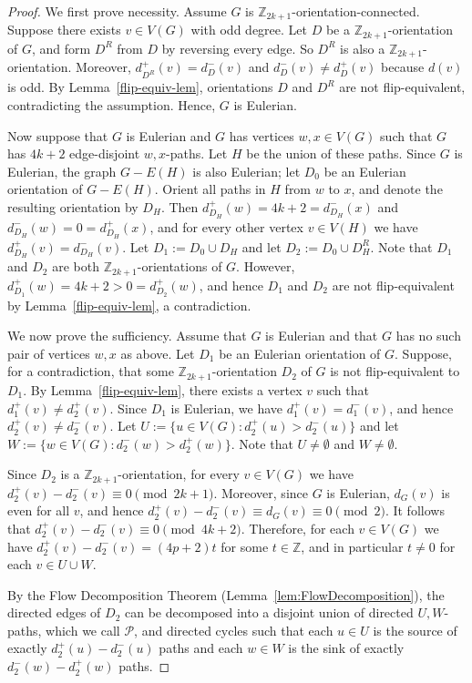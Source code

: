\documentclass[a4paper,12pt]{article}
\theoremstyle{plain}
\theoremstyle{definition}
\newcommand{\Z}{\mathbb{Z}}
\begin{document}
\begin{proof}
We first prove necessity. Assume $G$ is $\Z_{2k+1}$-orientation-connected.
Suppose there exists $v \in V(G)$ with odd degree. Let $D$ be a $\Z_{2k+1}$-orientation of $G$, and form $D^R$ from $D$ by reversing every edge. So $D^R$ is also a $\Z_{2k+1}$-orientation. 
Moreover, $d_{D^R}^+(v)=d_D^-(v)$ and $d_D^-(v)\neq d_D^+(v)$ because $d(v)$ is odd. By Lemma~\ref{flip-equiv-lem}, orientations $D$ and $D^R$ are not flip-equivalent, contradicting the assumption. Hence, $G$ is Eulerian.

Now suppose that $G$ is Eulerian and $G$ has vertices $w,x \in V(G)$ such that $G$ has $4k+2$ edge-disjoint $w,x$-paths. Let $H$ be the union of these paths. Since $G$ is Eulerian, the graph $G - E(H)$ is also Eulerian; let $D_0$ be an Eulerian orientation of $G - E(H)$. Orient all paths in $H$ from $w$ to $x$, and denote the resulting orientation by $D_H$. 
Then 
$d_{D_H}^+(w)=4k+2=d_{D_H}^-(x)$ and
$d_{D_H}^-(w)=0=d_{D_H}^+(x)$, and for every other vertex $v \in V(H)$ we have $d_{D_H}^+(v)=d_{D_H}^-(v)$. Let $D_1 := D_0 \cup D_H$ and let $D_2 := D_0 \cup D_H^R$. 
Note that $D_1$ and $D_2$ are both $\Z_{2k+1}$-orientations of $G$. However, $d_{D_1}^+(w)=4k+2 > 0=d_{D_2}^+(w)$, and hence $D_1$ and $D_2$ are not flip-equivalent by Lemma~\ref{flip-equiv-lem}, a contradiction.

We now prove the sufficiency. Assume that $G$ is Eulerian and that $G$ has no such pair of vertices $w,x$ as above. Let $D_1$ be an Eulerian orientation of $G$. Suppose, for a contradiction, that some $\Z_{2k+1}$-orientation $D_2$ of $G$ is not flip-equivalent to $D_1$. By Lemma~\ref{flip-equiv-lem}, there exists a vertex $v$ such that $d_{1}^+(v)\neq d_{2}^+(v)$. Since $D_1$ is Eulerian, we have $d_{1}^+(v)=d_{1}^-(v)$, and hence $d_{2}^+(v)\neq d_{2}^-(v)$.
Let $U:=\{u\in V(G): d_{2}^+(u)>d_{2}^-(u)\}$ and let $W:=\{w\in V(G): d_{2}^-(w)>d_{2}^+(w)\}$. 
Note that $U\neq \emptyset$ and $W\neq \emptyset$.

Since $D_2$ is a $\Z_{2k+1}$-orientation, for every $v\in V(G)$ we have $d_{2}^+(v)-d_{2}^-(v)\equiv 0 \pmod{2k+1}$. Moreover, since $G$ is Eulerian, $d_G(v)$ is even for all $v$, and hence $d_{2}^+(v)-d_{2}^-(v)\equiv d_G(v)\equiv 0 \pmod{2}$. It follows that $d_{2}^+(v)-d_{2}^-(v)\equiv 0 \pmod{4k+2}$. Therefore, for each $v\in V(G)$ we have $d_{2}^+(v)-d_{2}^-(v)=(4p+2)t$ for some $t\in \mathbb{Z}$, 
and in particular $t\neq 0$ for each $v\in U\cup W$.

By the Flow Decomposition Theorem (Lemma~\ref{lem:FlowDecomposition}), the directed edges of $D_2$ can be decomposed into a disjoint union of directed $U,W$-paths, which we call $\mathcal{P}$, and directed cycles such that each $u\in U$ is the source of exactly $d_{2}^+(u)-d_{2}^-(u)$ paths and each $w\in W$ is the sink of exactly $d_{2}^-(w)-d_{2}^+(w)$ paths.


\end{proof}
\end{document}
